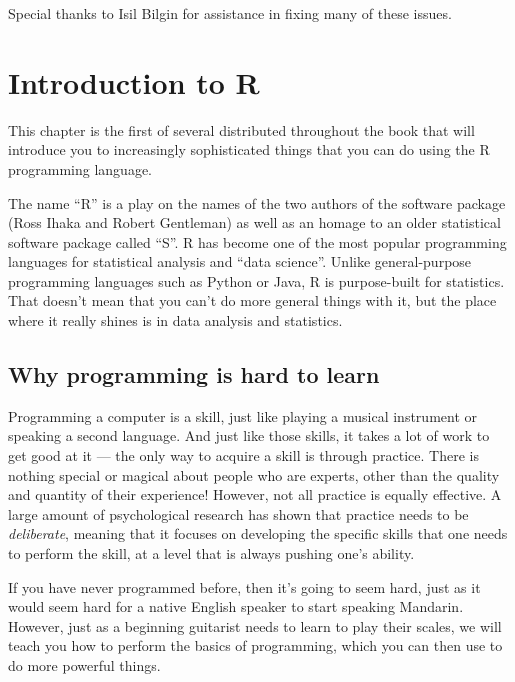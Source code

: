 \documentclass[12pt,]{book}
\begin{document}
Special thanks to Isil Bilgin for assistance in fixing many of these issues.

\hypertarget{introduction-to-r}{%
\chapter{Introduction to R}\label{introduction-to-r}}

This chapter is the first of several distributed throughout the book that will introduce you to increasingly sophisticated things that you can do using the R programming language.

The name ``R'' is a play on the names of the two authors of the software package (Ross Ihaka and Robert Gentleman) as well as an homage to an older statistical software package called ``S''.
R has become one of the most popular programming languages for statistical analysis and ``data science''. Unlike general-purpose programming languages such as Python or Java, R is purpose-built for statistics. That doesn't mean that you can't do more general things with it, but the place where it really shines is in data analysis and statistics.

\hypertarget{why-programming-is-hard-to-learn}{%
\section{Why programming is hard to learn}\label{why-programming-is-hard-to-learn}}

Programming a computer is a skill, just like playing a musical instrument or speaking a second language. And just like those skills, it takes a lot of work to get good at it --- the only way to acquire a skill is through practice. There is nothing special or magical about people who are experts, other than the quality and quantity of their experience! However, not all practice is equally effective. A large amount of psychological research has shown that practice needs to be \emph{deliberate}, meaning that it focuses on developing the specific skills that one needs to perform the skill, at a level that is always pushing one's ability.

If you have never programmed before, then it's going to seem hard, just as it would seem hard for a native English speaker to start speaking Mandarin. However, just as a beginning guitarist needs to learn to play their scales, we will teach you how to perform the basics of programming, which you can then use to do more powerful things.
\end{document}
